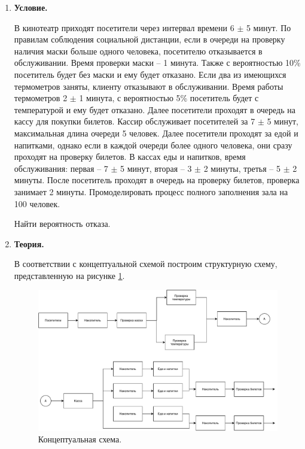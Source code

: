 \documentclass[a4paper,14pt]{extreport} %
\begin{document}
\begin{enumerate}

\item \textbf{Условие. }

В кинотеатр приходят посетители через интервал времени 6 $\pm$ 5 минут. По правилам соблюдения социальной дистанции, если в очереди на проверку наличия маски больше одного человека, посетителю отказывается в обслуживании. Время проверки маски -- 1 минута. Также с вероятностью 10\% посетитель будет без маски и ему будет отказано. Если два из имеющихся термометров заняты, клиенту отказывают в обслуживании. Время работы термометров 2 $\pm$ 1 минута, с вероятностью 5\% посетитель будет с температурой и ему будет отказано. Далее посетители проходят  в очередь на кассу для покупки билетов. Кассир обслуживает посетителей за 7 $\pm$ 5 минут, максимальная длина очереди 5 человек.  Далее посетители проходят за едой и напитками, однако если в каждой очереди более одного человека, они сразу проходят на проверку билетов.  В кассах еды и напитков, время обслуживания: первая -- 7 $\pm$ 5 минут, вторая -- 3 $\pm$ 2 минуты, третья -- 5 $\pm$ 2 минуты. После посетитель проходят в очередь на проверку билетов, проверка занимает 2 минуты. Промоделировать процесс полного заполнения зала на 100 человек. 

Найти вероятность отказа. 

\item \textbf{Теория. }

В соответствии с концептуальной схемой построим структурную схему, представленную на рисунке \ref{model}. 

\begin{figure}[H]
  \centering
  \includegraphics[scale=0.75]{model}
  \caption{Концептуальная схема.  }
  \label{model}
\end{figure}


\end{enumerate}
\end{document}
